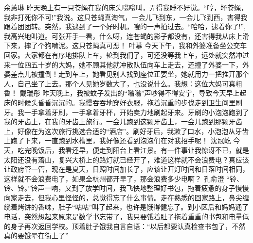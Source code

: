 \markdownRendererDocumentBegin
{}\markdownRendererInterblockSeparator
{}\markdownRendererInterblockSeparator
{}余蕙琳\markdownRendererInterblockSeparator
{}昨天晚上有一只苍蝇在我的床头嗡嗡叫，弄得我睡不好觉。“哼，坏苍蝇，我非打死你不可!”我说。这只苍蝇真淘气，一会儿飞到东，一会儿飞到西，害得我跟着团团转。突然，我逮到了一个好时机，嗖的一声拍过去。“哈哈，逮着你了!”,我高兴地叫道。可张开手一看，什么呀，连苍蝇的影子都没有，还害得我从床上滑下来，摔了个狗啃泥。这只苍蝇真可恶！\markdownRendererInterblockSeparator
{}\markdownRendererInterblockSeparator
{}叶慕\markdownRendererInterblockSeparator
{}今天下午，我和外婆准备坐公交车回家。大家都在有序地排队上车，轮到我们了，可还没等我上车，远处就突然冲过来一位四五十岁的大妈，她不顾其他就冲散队伍向车上走去，还撞了外婆一下，外婆差点儿被撞倒！走到车上，她看见别人找到座位正要坐，她就用力一把推开那个人，自己坐了上去。那个人见她岁数大了，也没说什么。我想：这位大妈可真粗鲁！\markdownRendererInterblockSeparator
{}\markdownRendererInterblockSeparator
{}戴瑞彤\markdownRendererInterblockSeparator
{}昨天晚上，我被蚊子发出的“嗡嗡”声吵得不得安宁，导致今天早上起床的时候头昏昏沉沉的。我慢吞吞地穿好衣服，拖着沉重的步伐走到卫生间里刷牙。我一手拿着牙刷，一手拿着牙杯，开始卖力地刷起牙来。牙刷的小泡泡跑到了我的牙齿上，在我的牙齿上旅行。一会儿跑到这颗牙齿上，一会儿跑到那颗牙齿上，好像在为这次旅行挑选合适的“酒店”。刷好牙后，我漱了口水，小泡泡从牙齿上跑了下来，一直跑到水槽里，我好像还看到泡泡们在对我招手呢！\markdownRendererInterblockSeparator
{}\markdownRendererInterblockSeparator
{}沈冠屹\markdownRendererInterblockSeparator
{}今天，吃完晚饭后，我看还早，便走到阳台上看江景。有一件事让我惊讶不已，就是太阳还没有落山，复兴大桥上的路灯就已经开了，难道这样就不会浪费电？真应该让政府管一管，现在是夏天，日照时间加长了，应该让开灯时间和日落时间相同，这样就不会浪费电了，如果全杭州都开早了，那会浪费多少电啊？\markdownRendererInterblockSeparator
{}\markdownRendererInterblockSeparator
{}孔俞澄\markdownRendererInterblockSeparator
{}“铃、铃、铃。”铃声一响，又到了放学时间，我飞快地整理好书包，拖着疲惫的身子慢慢向家走去，但我心里怪怪的，总觉得忘了什么事情。走在熟悉的回家路上，鼻尖缠绕着烤饼的香味，肚子“咕咕”叫了起来，也许是饿得健忘了。到小区后和妈妈通了电话，突然想起来原来是数学书忘带了，我只要饿着肚子拖着重重的书包和电量低的身子再次返回学校。顶着肚子饿我自言自语：“以后都要认真检查书包了，不然真的要饿晕在街上了”\markdownRendererInterblockSeparator
